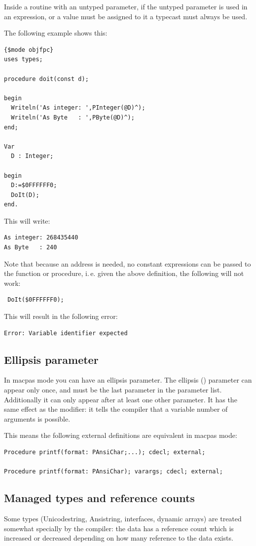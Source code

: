 Inside a routine with an untyped parameter, if the untyped parameter is used in an
expression, or a value must be assigned to it a typecast must always be used.

The following example shows this:
\begin{verbatim}
{$mode objfpc}
uses types;

procedure doit(const d);

begin
  Writeln('As integer: ',PInteger(@D)^);
  Writeln('As Byte   : ',PByte(@D)^);
end;

Var
  D : Integer;

begin
  D:=$0FFFFFF0;
  DoIt(D);
end.
\end{verbatim}
This will write:
\begin{verbatim}
As integer: 268435440
As Byte   : 240
\end{verbatim}

Note that because an address is needed, no constant expressions can be
passed to the function or procedure, i.\,e. given the above definition,
the following will not work:
\begin{verbatim}
 DoIt($0FFFFFF0);
\end{verbatim}
This will result in the following error:
\begin{verbatim}
Error: Variable identifier expected
\end{verbatim}


\subsection{Ellipsis parameter}
In macpas mode you can have an ellipsis parameter. 
The ellipsis (\var{\ldots}) parameter can appear only once, and must be the last parameter in the parameter
list. Additionally it can only appear after at least one other parameter.
It has the same effect as the  modifier: it tells the compiler that a variable number of arguments is possible.

This means the following external definitions are equivalent in macpas mode:
\begin{verbatim}
Procedure printf(format: PAnsiChar;...); cdecl; external;

Procedure printf(format: PAnsiChar); varargs; cdecl; external;
\end{verbatim}
 


\subsection{Managed types and reference counts}
Some types (Unicodestring, Ansistring, interfaces, dynamic arrays) are
treated somewhat specially by the compiler: the data has a reference count
which is increased or decreased depending on how many reference to the data
exists.

